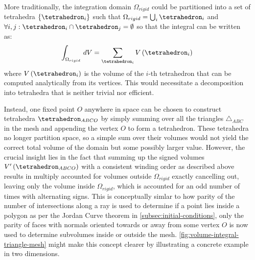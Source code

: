 \documentclass[oneside, a4paper]{book}
\newcommand\br[1]{\left(#1\right)}
\begin{document}
    More traditionally, the integration domain $\Omega_{rigid}$ could be partitioned into a set of tetrahedra $\{\tetrahedron_i\}$ such that $\Omega_{rigid} = \bigcup_i \tetrahedron_i$ and $\forall i,j: \tetrahedron_i \cap \tetrahedron_j = \emptyset$ so that the integral can be written as:
    \begin{equation}
      \int_{\Omega_{rigid}} \,dV = \sum_{\tetrahedron_i} V\br{\tetrahedron_i}
    \end{equation} where $V\br{\tetrahedron_i}$ is the volume of the $i$-th tetrahedron that can be computed analytically from its vertices. This would necessitate a decomposition into tetrahedra that is neither trivial nor efficient. 
    
    Instead, one fixed point $O$ anywhere in space can be chosen to construct tetrahedra $\tetrahedron_{ABCO}$ by simply summing over all the triangles $\triangle_{ABC}$ in the mesh and appending the vertex $O$ to form a tetrahedron. These tetrahedra no longer partition space, so a simple sum over their volumes would not yield the correct total volume of the domain but some possibly larger value. However, the crucial insight lies in the fact that summing up the signed volumes $V'\br{\tetrahedron_{ABCO}}$ with a consistent winding order as described above results in multiply accounted for volumes outside $\Omega_{rigid}$ exactly cancelling out, leaving only the volume inside $\Omega_{rigid}$, which is accounted for an odd number of times with alternating signs. This is conceptually simlar to how parity of the number of intersections along a ray is used to determine if a point lies inside a polygon as per the Jordan Curve theorem in \autoref{subsec:initial-conditions}, only the parity of faces with normals oriented towards or away from some vertex $O$ is now used to determine subvolumes inside or outside the mesh. \autoref{fig:volume-integral-triangle-mesh} might make this concept clearer by illustrating a concrete example in two dimensions. 
    
\end{document}

